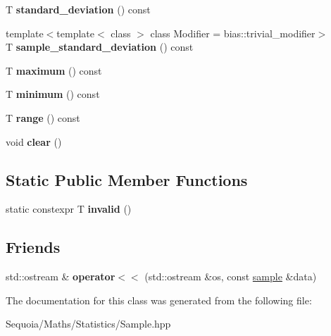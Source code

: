 \begin{DoxyCompactItemize}
\mbox{\label{classsequoia_1_1statistics_1_1sample_3_01_t_00_010_01_4_a4ca98c09efabdedac48759335192362f}} 
T {\bfseries standard\+\_\+deviation} () const
\item 
\mbox{\label{classsequoia_1_1statistics_1_1sample_3_01_t_00_010_01_4_acbd6169555111c4fa63fc00ae7f14485}} 
{\footnotesize template$<$template$<$ class $>$ class Modifier = bias\+::trivial\+\_\+modifier$>$ }\\T {\bfseries sample\+\_\+standard\+\_\+deviation} () const
\item 
\mbox{\label{classsequoia_1_1statistics_1_1sample_3_01_t_00_010_01_4_aaa481b7c0e0f3fc87bc2480813ba44a5}} 
T {\bfseries maximum} () const
\item 
\mbox{\label{classsequoia_1_1statistics_1_1sample_3_01_t_00_010_01_4_a7e86182b9b63746b182846dc6f6ec474}} 
T {\bfseries minimum} () const
\item 
\mbox{\label{classsequoia_1_1statistics_1_1sample_3_01_t_00_010_01_4_aa0e8583daba3361ecaaf65f81d496e70}} 
T {\bfseries range} () const
\item 
\mbox{\label{classsequoia_1_1statistics_1_1sample_3_01_t_00_010_01_4_a6b46476ce89dc26bfd824ef160b4a05f}} 
void {\bfseries clear} ()
\end{DoxyCompactItemize}
\subsection*{Static Public Member Functions}
\begin{DoxyCompactItemize}
\item 
\mbox{\label{classsequoia_1_1statistics_1_1sample_3_01_t_00_010_01_4_aed6b0fd0e65302284979a2aa45c64b25}} 
static constexpr T {\bfseries invalid} ()
\end{DoxyCompactItemize}
\subsection*{Friends}
\begin{DoxyCompactItemize}
\item 
\mbox{\label{classsequoia_1_1statistics_1_1sample_3_01_t_00_010_01_4_ab83ad5239acca8b74ecef294271ab010}} 
std\+::ostream \& {\bfseries operator$<$$<$} (std\+::ostream \&os, const \mbox{\hyperlink{classsequoia_1_1statistics_1_1sample}{sample}} \&data)
\end{DoxyCompactItemize}


The documentation for this class was generated from the following file\+:\begin{DoxyCompactItemize}
\item 
Sequoia/\+Maths/\+Statistics/Sample.\+hpp\end{DoxyCompactItemize}
